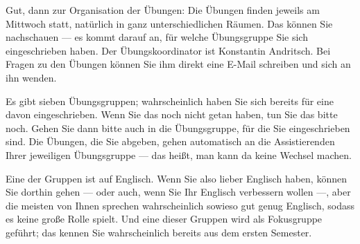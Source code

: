 \begin{spoken-clean}[00:05:27 - 00:07:08]
Gut, dann zur Organisation der Übungen: Die Übungen finden jeweils am Mittwoch statt, natürlich in ganz unterschiedlichen Räumen. Das können Sie nachschauen --- es kommt darauf an, für welche Übungsgruppe Sie sich eingeschrieben haben. Der Übungskoordinator ist Konstantin Andritsch. Bei Fragen zu den Übungen können Sie ihm direkt eine E-Mail schreiben und sich an ihn wenden.

Es gibt sieben Übungsgruppen; wahrscheinlich haben Sie sich bereits für eine davon eingeschrieben. Wenn Sie das noch nicht getan haben, tun Sie das bitte noch. Gehen Sie dann bitte auch in die Übungsgruppe, für die Sie eingeschrieben sind. Die Übungen, die Sie abgeben, gehen automatisch an die Assistierenden Ihrer jeweiligen Übungsgruppe --- das heißt, man kann da keine Wechsel machen.

Eine der Gruppen ist auf Englisch. Wenn Sie also lieber Englisch haben, können Sie dorthin gehen --- oder auch, wenn Sie Ihr Englisch verbessern wollen ---, aber die meisten von Ihnen sprechen wahrscheinlich sowieso gut genug Englisch, sodass es keine große Rolle spielt. Und eine dieser Gruppen wird als Fokusgruppe geführt; das kennen Sie wahrscheinlich bereits aus dem ersten Semester.
\end{spoken-clean}

